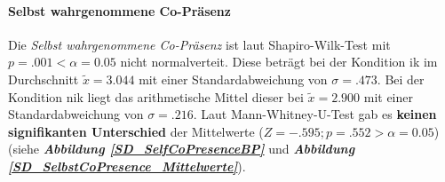 \documentclass[a4paper,11pt]{article}%
\renewcommand{\\}{\vspace*{0.5\baselineskip} \newline}
\begin{document}
\paragraph{Selbst wahrgenommene Co-Präsenz}
Die \textit{Selbst wahrgenommene Co-Präsenz} ist laut Shapiro-Wilk-Test mit $p = .001 < \alpha = 0.05$ nicht normalverteit.
Diese beträgt bei der Kondition \ac{ik} im Durchschnitt $\tilde x = 3.044$ mit einer Standardabweichung von $\sigma = .473$.\newline 
Bei der Kondition \ac{nik} liegt das arithmetische Mittel dieser bei $\tilde x = 2.900$ mit einer Standardabweichung von $\sigma = .216$. 
Laut Mann-Whitney-U-Test gab es \textbf{keinen signifikanten Unterschied} der Mittelwerte ($ Z = -.595; p = .552 > \alpha = 0.05$) (siehe \textbf{\textit{Abbildung \ref{SD_SelfCoPresenceBP}}} und \textbf{\textit{Abbildung \ref{SD_SelbstCoPresence_Mittelwerte}}}).
	
\end{document}
